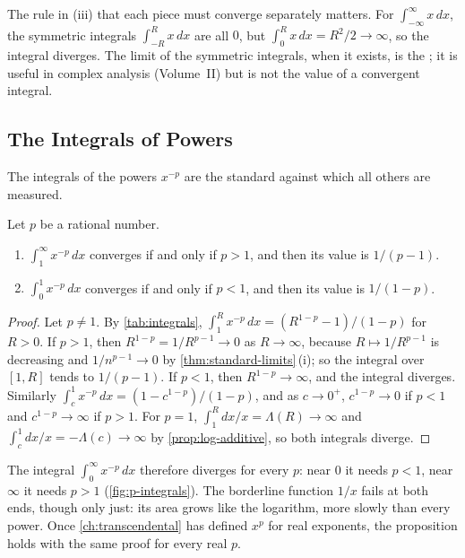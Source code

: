 The rule in (iii) that each piece must converge separately matters. For $\int_{-\infty}^\infty x\,dx$, the symmetric integrals $\int_{-R}^Rx\,dx$ are all $0$, but $\int_0^Rx\,dx=R^2/2\to\infty$, so the integral diverges. The limit of the symmetric integrals, when it exists, is the ; it is useful in complex analysis (Volume~II) but is not the value of a convergent integral.

\subsection{The Integrals of Powers}

The integrals of the powers $x^{-p}$ are the standard against which all others are measured.

\begin{proposition}
\label{prop:p-integrals}
Let $p$ be a rational number.
\begin{enumerate}
\item $\int_1^\infty x^{-p}\,dx$ converges if and only if $p>1$, and then its value is $1/(p-1)$.
\item $\int_0^1x^{-p}\,dx$ converges if and only if $p<1$, and then its value is $1/(1-p)$.
\end{enumerate}
\end{proposition}

\begin{proof}
Let $p\ne1$. By \cref{tab:integrals}, $\int_1^Rx^{-p}\,dx=(R^{1-p}-1)/(1-p)$ for $R>0$. If $p>1$, then $R^{1-p}=1/R^{p-1}\to0$ as $R\to\infty$, because $R\mapsto1/R^{p-1}$ is decreasing and $1/n^{p-1}\to0$ by \cref{thm:standard-limits}\,(i); so the integral over $[1,R]$ tends to $1/(p-1)$. If $p<1$, then $R^{1-p}\to\infty$, and the integral diverges. Similarly $\int_c^1x^{-p}\,dx=(1-c^{1-p})/(1-p)$, and as $c\to0^+$, $c^{1-p}\to0$ if $p<1$ and $c^{1-p}\to\infty$ if $p>1$. For $p=1$, $\int_1^R dx/x=\Lambda(R)\to\infty$ and $\int_c^1dx/x=-\Lambda(c)\to\infty$ by \cref{prop:log-additive}, so both integrals diverge.
\end{proof}

The integral $\int_0^\infty x^{-p}\,dx$ therefore diverges for every $p$: near $0$ it needs $p<1$, near $\infty$ it needs $p>1$ (\cref{fig:p-integrals}). The borderline function $1/x$ fails at both ends, though only just: its area grows like the logarithm, more slowly than every power. Once \cref{ch:transcendental} has defined $x^p$ for real exponents, the proposition holds with the same proof for every real $p$.

